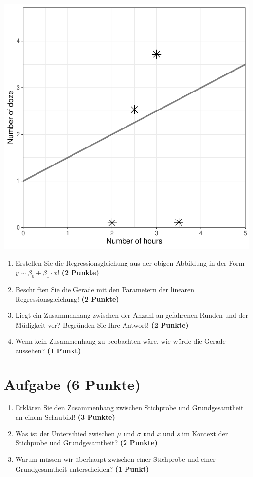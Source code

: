 \documentclass[a4paper, 10pt]{scrartcl}\usepackage[]{graphicx}\usepackage[]{color}
\makeatletter
\def\maxwidth{ %
  \ifdim\Gin@nat@width>\linewidth
    \linewidth
  \else
    \Gin@nat@width
  \fi
}
\makeatother
\begin{document}
{\centering \includegraphics[width=\maxwidth]{img/scatter-02-1} 

}




\begin{enumerate}
\item Erstellen Sie die Regressionsgleichung aus der obigen Abbildung in
  der Form $y \sim \beta_0 + \beta_1 \cdot x$! \textbf{(2 Punkte)}
\item Beschriften Sie die Gerade mit den Parametern der linearen
  Regressionsgleichung! \textbf{(2 Punkte)}
\item Liegt ein Zusammenhang zwischen der Anzahl an gefahrenen Runden und
  der M{\"u}digkeit vor? Begr{\"u}nden Sie Ihre Antwort! \textbf{(2 Punkte)}
\item Wenn kein Zusammenhang zu beobachten w{\"a}re, wie w{\"u}rde die Gerade aussehen? \textbf{(1 Punkt)}
\end{enumerate} 
\clearpage

\section{Aufgabe \hfill (6 Punkte)}

\begin{enumerate}
\item Erkl{\"a}ren Sie den Zusammenhang zwischen Stichprobe und Grundgesamtheit
  an einem Schaubild! \textbf{(3 Punkte)}
\item Was ist der Unterschied zwischen $\mu$ und $\sigma$ und $\bar{x}$ und
  $s$ im Kontext der Stichprobe und Grundgesamtheit? \textbf{(2 Punkte)}
\item Warum m{\"u}ssen wir {\"u}berhaupt zwischen einer Stichprobe und einer
  Grundgesamtheit unterscheiden? \textbf{(1 Punkt)}
\end{enumerate} 
\clearpage
\end{document}

